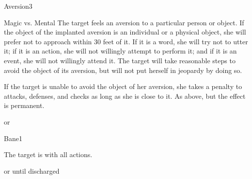 \begin{spellsection}{Aversion}{3}
    \begin{spellheader}
    \end{spellheader}
    \begin{spellcontent}
        \begin{spelltargetinginfo}
        \end{spelltargetinginfo}
        \begin{spelleffects}
            \begin{spellattack}{Magic vs. Mental}
                \spellsuccess The target feels an aversion to a particular person or object. If the object of the implanted aversion is an individual or a physical object, she will prefer not to approach within 30 feet of it. If it is a word, she will try not to utter it; if it is an action, she will not willingly attempt to perform it; and if it is an event, she will not willingly attend it. The target will take reasonable steps to avoid the object of its aversion, but will not put herself in jeopardy by doing so.
                \par If the target is unable to avoid the object of her aversion, she takes a  penalty to attacks, defenses, and checks as long as she is close to it.
                \spellcritical As above, but the effect is permanent.
            \end{spellattack}
            \spelldur \durshort or \durperm
        \end{spelleffects}
    \end{spellcontent}
    \begin{spellfooter}
        \miscastrandom
    \end{spellfooter}
\end{spellsection}


\begin{spellsection}{Bane}{1}
    \begin{spellheader}
    \end{spellheader}
    \begin{spellcontent}
        \begin{spelltargetinginfo}
        \end{spelltargetinginfo}
        \begin{spelleffects}
            \spelleffect The target is \impaired with all actions.

            \spelldur \durshort or until discharged \dismissable
        \end{spelleffects}
    \end{spellcontent}
    \begin{spellfooter}
        \miscastrandom
    \end{spellfooter}
\end{spellsection}

